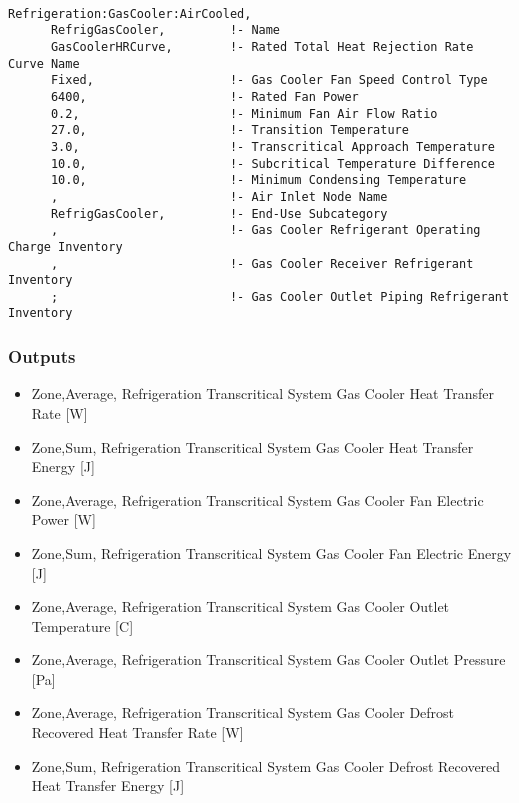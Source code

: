 \begin{lstlisting}

Refrigeration:GasCooler:AirCooled,
      RefrigGasCooler,         !- Name
      GasCoolerHRCurve,        !- Rated Total Heat Rejection Rate Curve Name
      Fixed,                   !- Gas Cooler Fan Speed Control Type
      6400,                    !- Rated Fan Power
      0.2,                     !- Minimum Fan Air Flow Ratio
      27.0,                    !- Transition Temperature
      3.0,                     !- Transcritical Approach Temperature
      10.0,                    !- Subcritical Temperature Difference
      10.0,                    !- Minimum Condensing Temperature
      ,                        !- Air Inlet Node Name
      RefrigGasCooler,         !- End-Use Subcategory
      ,                        !- Gas Cooler Refrigerant Operating Charge Inventory
      ,                        !- Gas Cooler Receiver Refrigerant Inventory
      ;                        !- Gas Cooler Outlet Piping Refrigerant Inventory
\end{lstlisting}

\subsubsection{Outputs}\label{outputs-10-006}

\begin{itemize}
\item
  Zone,Average, Refrigeration Transcritical System Gas Cooler Heat Transfer Rate {[}W{]}
\item
  Zone,Sum, Refrigeration Transcritical System Gas Cooler Heat Transfer Energy {[}J{]}
\item
  Zone,Average, Refrigeration Transcritical System Gas Cooler Fan Electric Power {[}W{]}
\item
  Zone,Sum, Refrigeration Transcritical System Gas Cooler Fan Electric Energy {[}J{]}
\item
  Zone,Average, Refrigeration Transcritical System Gas Cooler Outlet Temperature {[}C{]}
\item
  Zone,Average, Refrigeration Transcritical System Gas Cooler Outlet Pressure {[}Pa{]}
\item
  Zone,Average, Refrigeration Transcritical System Gas Cooler Defrost Recovered Heat Transfer Rate {[}W{]}
\item
  Zone,Sum, Refrigeration Transcritical System Gas Cooler Defrost Recovered Heat Transfer Energy {[}J{]}
\end{itemize}


